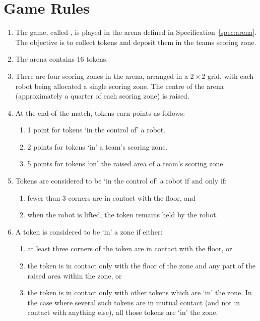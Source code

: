 \section{Game Rules}
\label{sec:rules}

\begin{enumerate}
  \item The game, called \emph{\gamename}, is played in the arena defined in
        Specification~\ref{spec:arena}. The objective is to collect tokens and
        deposit them in the teams scoring zone.
  \item The arena contains 16 tokens.
  \item There are four scoring zones in the arena, arranged in a $2\times2$
        grid, with each robot being allocated a single scoring zone. The centre
        of the arena (approximately a quarter of each scoring zone) is raised.
  \item At the end of the match, tokens earn points as follows:
    \begin{enumerate}
      \item 1 point for tokens `in the control of' a robot.
      \item 2 points for tokens `in' a team's scoring zone.
      \item 5 points for tokens `on' the raised area of a team's scoring zone.
    \end{enumerate}
  \item Tokens are considered to be `in the control of' a robot if and only if:
    \begin{enumerate}
      \item fewer than 3 corners are in contact with the floor, and
      \item when the robot is lifted, the token remains held by the robot.
    \end{enumerate}
  \item A token is considered to be `in' a zone if either:
    \begin{enumerate}
      \item at least three corners of the token are in contact with the floor, or
      \item the token is in contact only with the floor of the zone and any part
            of the raised area within the zone, or
      \item the token is in contact only with other tokens which are `in' the zone.
            In the case where several such tokens are in mutual contact (and not in
            contact with anything else), all those tokens are `in' the zone.

\end{enumerate}
\end{enumerate}
